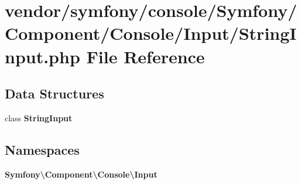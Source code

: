 \section{vendor/symfony/console/\+Symfony/\+Component/\+Console/\+Input/\+String\+Input.php File Reference}
\label{_string_input_8php}
\subsection*{Data Structures}
\begin{DoxyCompactItemize}
\item 
class {\bf String\+Input}
\end{DoxyCompactItemize}
\subsection*{Namespaces}
\begin{DoxyCompactItemize}
\item 
 {\bf Symfony\textbackslash{}\+Component\textbackslash{}\+Console\textbackslash{}\+Input}
\end{DoxyCompactItemize}

